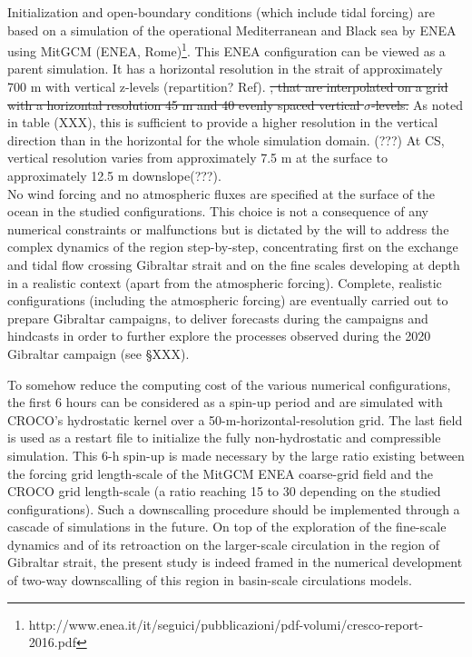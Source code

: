 \color{blue}Initialization and open-boundary conditions (which include tidal forcing) are based on a simulation of the operational Mediterranean and Black sea by ENEA using MitGCM (ENEA, Rome)\footnote{http://www.enea.it/it/seguici/pubblicazioni/pdf-volumi/cresco-report-2016.pdf}. This ENEA configuration can be viewed as a parent simulation. It has a horizontal resolution in the strait of approximately 700 m with vertical z-levels (repartition? Ref). \sout{, that are interpolated on a grid with a horizontal resolution 45 m and 40 evenly spaced vertical $\sigma$-levels.} As noted in table (XXX), this is sufficient to provide a higher resolution in the vertical direction than in the horizontal for the whole simulation domain. (???) \color{black} At CS, vertical resolution varies from approximately 7.5 m at the surface to approximately 12.5 m downslope(???).\\
No wind forcing and no atmospheric fluxes are specified at the surface of the ocean in the studied configurations. This choice is not a consequence of any numerical constraints or malfunctions but is dictated by the will to address the complex dynamics of the region step-by-step, concentrating first on the exchange and tidal flow crossing Gibraltar strait and on the fine scales developing at depth in a realistic context (apart from the atmospheric forcing). Complete, realistic configurations (including the atmospheric forcing) are eventually carried out to prepare Gibraltar campaigns, to deliver forecasts during the campaigns and hindcasts in order to further explore the processes observed during the 2020 Gibraltar campaign (see \S XXX).\color{black}

\color{blue}To somehow reduce the computing cost of the various numerical configurations, the first 6 hours can be considered as a spin-up period and are simulated with CROCO's hydrostatic kernel over a 50-m-horizontal-resolution grid. The last field is used as a restart file to initialize the fully non-hydrostatic and compressible simulation. This 6-h spin-up is made necessary by the large ratio existing between the forcing grid length-scale of the MitGCM ENEA coarse-grid field and the CROCO grid length-scale (a ratio reaching 15 to 30 depending on the studied configurations). Such a downscalling procedure should be implemented through a cascade of simulations in the future. On top of the exploration of the fine-scale dynamics and of its retroaction on the larger-scale circulation in the region of Gibraltar strait, the present study is indeed framed in the numerical development of two-way downscalling of this region in basin-scale circulations models.\color{black}

